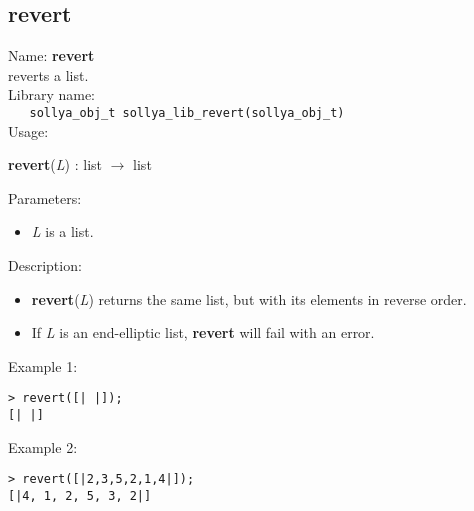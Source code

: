 \subsection{revert}
\label{labrevert}
\noindent Name: \textbf{revert}\\
\phantom{aaa}reverts a list.\\[0.2cm]
\noindent Library name:\\
\verb|   sollya_obj_t sollya_lib_revert(sollya_obj_t)|\\[0.2cm]
\noindent Usage: 
\begin{center}
\textbf{revert}(\emph{L}) : \textsf{list} $\rightarrow$ \textsf{list}\\
\end{center}
Parameters: 
\begin{itemize}
\item \emph{L} is a list.
\end{itemize}
\noindent Description: \begin{itemize}

\item \textbf{revert}(\emph{L}) returns the same list, but with its elements in reverse order.

\item If \emph{L} is an end-elliptic list, \textbf{revert} will fail with an error.
\end{itemize}
\noindent Example 1: 
\begin{center}\begin{minipage}{15cm}\begin{Verbatim}[frame=single,commandchars=\\\|\~]
> revert([| |]);
[| |]
\end{Verbatim}
\end{minipage}\end{center}
\noindent Example 2: 
\begin{center}\begin{minipage}{15cm}\begin{Verbatim}[frame=single,commandchars=\\\|\~]
> revert([|2,3,5,2,1,4|]);
[|4, 1, 2, 5, 3, 2|]
\end{Verbatim}
\end{minipage}\end{center}
